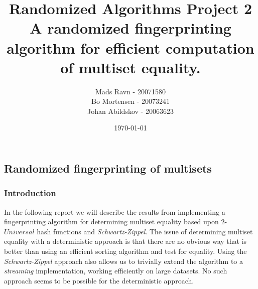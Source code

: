 \documentclass[article,a4paper,oneside]{article}
\newcommand{\+}[1]{\ensuremath{\boldsymbol{#1}}}
\begin{document}
\title{
Randomized Algorithms Project 2\\
A randomized fingerprinting algorithm for efficient computation of multiset equality.
}

\author{
  Mads Ravn - 20071580\\
  Bo Mortensen - 20073241\\
  Johan Abildskov - 20063623
}

\date{\today}

\maketitle

\newpage

\subsection*{Randomized fingerprinting of multisets}
\subsubsection*{Introduction}
In the following report we will describe the results from implementing a fingerprinting algorithm for determining multiset equality based upon $2$-$Universal$ hash functions and \emph{Schwartz-Zippel}.
The issue of determining multiset equality with a deterministic approach is that there are no obvious way that is better than using an efficient sorting algorithm and test for equality. Using the \emph{Schwartz-Zippel} approach also allows us to trivially extend the algorithm to a \emph{streaming} implementation, working efficiently on large datasets. No such approach seems to be possible for the deterministic approach.
\end{document}
